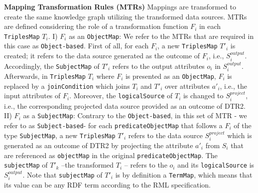\noindent\textbf{Mapping Transformation Rules (MTRs)}
Mappings are transformed to create the same knowledge graph utilizing the transformed data sources. MTRs are defined considering the role of a transformation function $F_i$ in each \verb|TriplesMap| $T_i$.
I) $F_i$ as an \verb|ObjectMap|: 
We refer to the MTRs that are required in this case as \verb|Object-based|. First of all, for each $F_i$, a new \verb|TriplesMap| $T'_i$ is created; it refers to the data source generated as the outcome of $F_i$, i.e., $S_i^{output}$. Accordingly, the \verb|SubjectMap| of $T'_i$ refers to the output attributes $o_i$ in $S_i^{output}$. Afterwards, in \verb|TriplesMap| $T_i$ where $F_i$ is presented as an \verb|ObjectMap|, $F_i$ is replaced by a \verb|joinCondition| which joins $T_i$ and $T'_i$ over attributes $a'_i$, i.e., the input attributes of $F_i$. Moreover, the \verb|logicalSource| of $T_i$ is changed to $S_i
^{project}$, i.e., the corresponding projected data source provided as an outcome of DTR2. 
II) $F_i$ as a \verb|SubjectMap|: Contrary to the \verb|Object-based|, in this set of MTR - we refer to as \verb|Subject-based|- for each \verb|predicateObjectMap| that follows a $F_i$ of the type \verb|SubjectMap|, a new \verb|TriplesMap| $T'_i$ refers to the data source $S_i^{project}$ which is generated as an outcome of DTR2 by projecting the attribute $a'_i$ from $S_i$ that are referenced as \verb|objectMap| in the original \verb|predicateObjectMap|. The \verb|subjectMap| of $T'_k$ --the transformed $T_i$  -- refers to the $o_i$ and its \verb|logicalSource| is $S_i^{output}$.   
Note that \verb|subjectMap| of $T'_i$ is by definition a \verb|TermMap|, which means that its value can be any RDF term according to the RML specification.

